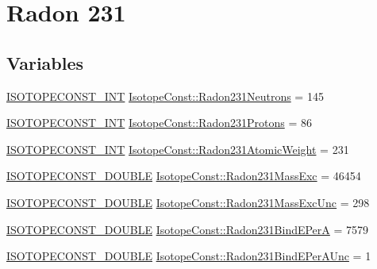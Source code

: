 \hypertarget{group___isotope_const-_radon-_rn231}{}\section{Radon 231}
\label{group___isotope_const-_radon-_rn231}
\subsection*{Variables}
\begin{DoxyCompactItemize}
\item 
\mbox{\hyperlink{group___isotope_const-_macros_ga5f18360b3e99483a35c32d789e62621c}{I\+S\+O\+T\+O\+P\+E\+C\+O\+N\+S\+T\+\_\+\+I\+NT}} \mbox{\hyperlink{group___isotope_const-_radon-_rn231_ga33d762eff88bda4afc92c20aa36709a9}{Isotope\+Const\+::\+Radon231\+Neutrons}} = 145
\item 
\mbox{\hyperlink{group___isotope_const-_macros_ga5f18360b3e99483a35c32d789e62621c}{I\+S\+O\+T\+O\+P\+E\+C\+O\+N\+S\+T\+\_\+\+I\+NT}} \mbox{\hyperlink{group___isotope_const-_radon-_rn231_ga5c6e9939d20c6eb989060b3f87d190bc}{Isotope\+Const\+::\+Radon231\+Protons}} = 86
\item 
\mbox{\hyperlink{group___isotope_const-_macros_ga5f18360b3e99483a35c32d789e62621c}{I\+S\+O\+T\+O\+P\+E\+C\+O\+N\+S\+T\+\_\+\+I\+NT}} \mbox{\hyperlink{group___isotope_const-_radon-_rn231_ga071a584feed814a37dd27a29166376f4}{Isotope\+Const\+::\+Radon231\+Atomic\+Weight}} = 231
\item 
\mbox{\hyperlink{group___isotope_const-_macros_ga8f45a7272ce02c0b4c65c44636ed719a}{I\+S\+O\+T\+O\+P\+E\+C\+O\+N\+S\+T\+\_\+\+D\+O\+U\+B\+LE}} \mbox{\hyperlink{group___isotope_const-_radon-_rn231_ga50596ab8955d3dfaba32bcaf6edc9448}{Isotope\+Const\+::\+Radon231\+Mass\+Exc}} = 46454
\item 
\mbox{\hyperlink{group___isotope_const-_macros_ga8f45a7272ce02c0b4c65c44636ed719a}{I\+S\+O\+T\+O\+P\+E\+C\+O\+N\+S\+T\+\_\+\+D\+O\+U\+B\+LE}} \mbox{\hyperlink{group___isotope_const-_radon-_rn231_ga15a19c8c958a46d086783b2398a66455}{Isotope\+Const\+::\+Radon231\+Mass\+Exc\+Unc}} = 298
\item 
\mbox{\hyperlink{group___isotope_const-_macros_ga8f45a7272ce02c0b4c65c44636ed719a}{I\+S\+O\+T\+O\+P\+E\+C\+O\+N\+S\+T\+\_\+\+D\+O\+U\+B\+LE}} \mbox{\hyperlink{group___isotope_const-_radon-_rn231_ga7970bb7fe64b12348b6f9ef25325f421}{Isotope\+Const\+::\+Radon231\+Bind\+E\+PerA}} = 7579
\item 
\mbox{\hyperlink{group___isotope_const-_macros_ga8f45a7272ce02c0b4c65c44636ed719a}{I\+S\+O\+T\+O\+P\+E\+C\+O\+N\+S\+T\+\_\+\+D\+O\+U\+B\+LE}} \mbox{\hyperlink{group___isotope_const-_radon-_rn231_ga76253ed8bee6fdf513d69c74f16f4caa}{Isotope\+Const\+::\+Radon231\+Bind\+E\+Per\+A\+Unc}} = 1

\end{DoxyCompactItemize}
